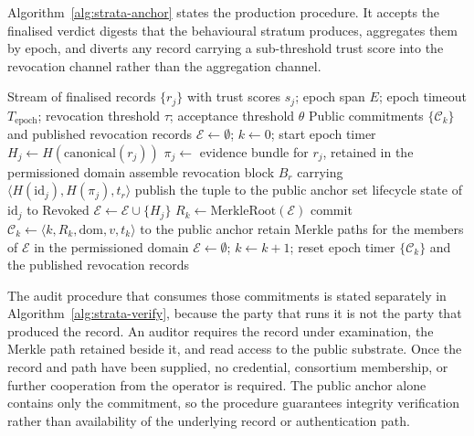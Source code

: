 Algorithm~\ref{alg:strata-anchor} states the production procedure. It accepts the finalised verdict digests that the behavioural stratum produces, aggregates them by epoch, and diverts any record carrying a sub-threshold trust score into the revocation channel rather than the aggregation channel.

\begin{algorithm}[t]
\caption{Epoch anchoring and revocation-proof commitment}
\label{alg:strata-anchor}
\begin{algorithmic}[1]
\Require Stream of finalised records $\{r_j\}$ with trust scores $s_j$; epoch span $E$; epoch timeout $T_{\mathrm{epoch}}$; revocation threshold $\tau$; acceptance threshold $\theta$
\Ensure Public commitments $\{\mathcal{C}_k\}$ and published revocation records
\State $\mathcal{E} \gets \emptyset$; \; $k \gets 0$; \; start epoch timer
  \State $H_j \gets H(\mathrm{canonical}(r_j))$
    \State $\pi_j \gets$ evidence bundle for $r_j$, retained in the permissioned domain
    \State assemble revocation block $B_r$ carrying $\langle H(\mathrm{id}_j), H(\pi_j), t_r \rangle$
      \State publish the tuple to the public anchor
      \State set lifecycle state of $\mathrm{id}_j$ to Revoked
    \EndIf
  \EndIf
  \State $\mathcal{E} \gets \mathcal{E} \cup \{H_j\}$
    \State $R_k \gets \mathrm{MerkleRoot}(\mathcal{E})$
    \State commit $\mathcal{C}_k \gets \langle k, R_k, \mathrm{dom}, v, t_k \rangle$ to the public anchor
    \State retain Merkle paths for the members of $\mathcal{E}$ in the permissioned domain
    \State $\mathcal{E} \gets \emptyset$; \; $k \gets k+1$; \; reset epoch timer
  \EndIf
\EndFor
\State \Return $\{\mathcal{C}_k\}$ and the published revocation records
\end{algorithmic}
\end{algorithm}

The audit procedure that consumes those commitments is stated separately in
Algorithm~\ref{alg:strata-verify}, because the party that runs it is not the
party that produced the record. An auditor requires the record under examination,
the Merkle path retained beside it, and read access to the public substrate. Once
the record and path have been supplied, no credential, consortium membership, or
further cooperation from the operator is required. The public anchor alone
contains only the commitment, so the procedure guarantees integrity verification
rather than availability of the underlying record or authentication path.

